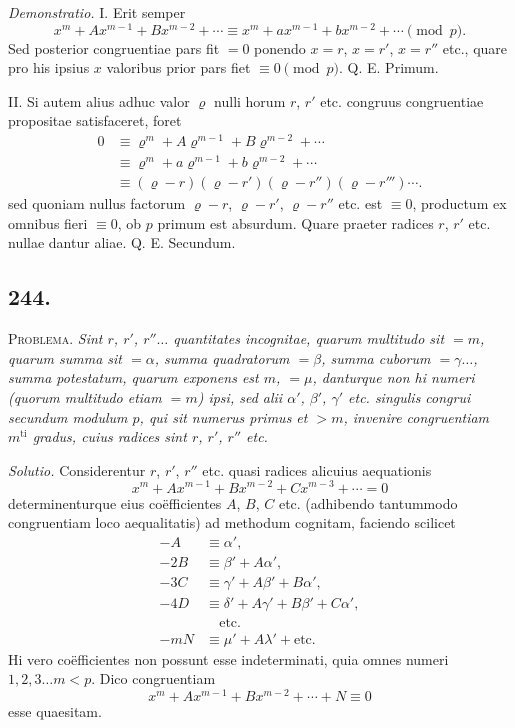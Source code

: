 \documentclass[12pt]{article}
\begin{document}
\textit{Demonstratio.} I. Erit semper
\[
x^m+A x^{m-1}+B x^{m-2}+\cdots \equiv x^m+a x^{m-1}+b x^{m-2}+\cdots \pmod p.
\]
Sed posterior congruentiae pars fit $=0$ ponendo $x=r$, $x=r'$, $x=r''$ etc., quare pro his ipsius $x$ valoribus prior pars fiet $\equiv 0\pmod p$. Q. E. Primum.

II. Si autem alius adhuc valor $\varrho$ nulli horum $r$, $r'$ etc. congruus congruentiae propositae satisfaceret, foret
\[
\begin{aligned}
0&\equiv \varrho^m+A\varrho^{m-1}+B\varrho^{m-2}+\cdots \\
&\equiv \varrho^m+a\varrho^{m-1}+b\varrho^{m-2}+\cdots \\
&\equiv (\varrho-r)(\varrho-r')(\varrho-r'')(\varrho-r''')\cdots .
\end{aligned}
\]
sed quoniam nullus factorum $\varrho-r$, $\varrho-r'$, $\varrho-r''$ etc. est $\equiv 0$, productum ex omnibus fieri $\equiv 0$, ob $p$ primum est absurdum. Quare praeter radices $r$, $r'$ etc. nullae dantur aliae. Q. E. Secundum.

\subsection*{244.}
\textsc{Problema.} \textit{Sint $r$, $r'$, $r''\ldots$ quantitates incognitae, quarum multitudo sit $=m$, quarum summa sit $=\alpha$, summa quadratorum $=\beta$, summa cuborum $=\gamma\ldots$, summa potestatum, quarum exponens est $m$, $=\mu$, danturque non hi numeri (quorum multitudo etiam $=m$) ipsi, sed alii $\alpha'$, $\beta'$, $\gamma'$ etc. singulis congrui secundum modulum $p$, qui sit numerus primus et $>m$, invenire congruentiam $m^{\mathrm{ti}}$ gradus, cuius radices sint $r$, $r'$, $r''$ etc.}

\textit{Solutio.} Considerentur $r$, $r'$, $r''$ etc. quasi radices alicuius aequationis
\[
x^m+A x^{m-1}+B x^{m-2}+C x^{m-3}+\cdots=0
\]
determinenturque eius coëfficientes $A$, $B$, $C$ etc. (adhibendo tantummodo congruentiam loco aequalitatis) ad methodum cognitam, faciendo scilicet
\[
\begin{aligned}
-A&\equiv \alpha',\\
-2B&\equiv \beta' + A\alpha',\\
-3C&\equiv \gamma' + A\beta' + B\alpha',\\
-4D&\equiv \delta' + A\gamma' + B\beta' + C\alpha',\\
&\quad\text{etc.}\\
-mN&\equiv \mu' + A\lambda' + \text{etc.}
\end{aligned}
\]
Hi vero coëfficientes non possunt esse indeterminati, quia omnes numeri $1,2,3\ldots m<p$. Dico congruentiam
\[
x^m+A x^{m-1}+B x^{m-2}+\cdots+N\equiv 0
\]
esse quaesitam.
\end{document}
